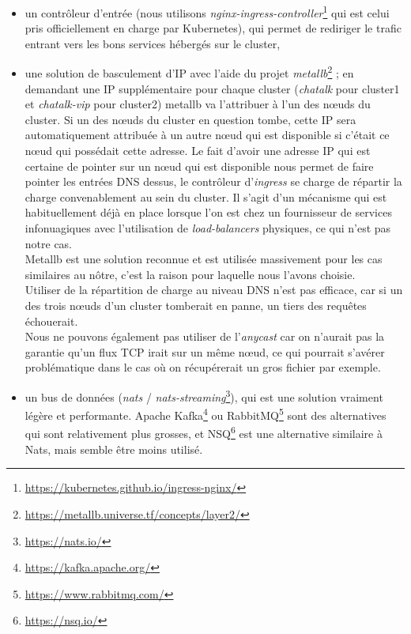 \begin{itemize}
\item
  un contrôleur d'entrée (nous utilisons
  \textit{nginx-ingress-controller}\footnote{
    \url{https://kubernetes.github.io/ingress-nginx/}}
  qui est celui pris officiellement en charge par Kubernetes), qui
  permet de rediriger le trafic entrant vers les bons services hébergés
  sur le cluster,
\item
  une solution de basculement d'IP avec l'aide du projet
  \textit{metallb}\footnote{
    \url{https://metallb.universe.tf/concepts/layer2/}}
  ; en demandant une IP supplémentaire pour chaque cluster
  (\textit{chatalk} pour cluster1 et \textit{chatalk-vip} pour cluster2)
  metallb va l'attribuer à l'un des nœuds du cluster. Si un des nœuds du
  cluster en question tombe, cette IP sera automatiquement attribuée à
  un autre nœud qui est disponible si c'était ce nœud qui possédait
  cette adresse. Le fait d'avoir une adresse IP qui est certaine de
  pointer sur un nœud qui est disponible nous permet de faire pointer
  les entrées DNS dessus, le contrôleur d'\textit{ingress} se charge de
  répartir la charge convenablement au sein du cluster. Il s'agit d'un
  mécanisme qui est habituellement déjà en place lorsque l'on est chez
  un fournisseur de services infonuagiques avec l'utilisation de
  \textit{load-balancers} physiques, ce qui n'est pas notre cas.\\
  Metallb est une solution reconnue et est utilisée massivement pour les
  cas similaires au nôtre, c'est la raison pour laquelle nous l'avons
  choisie.\\
  Utiliser de la répartition de charge au niveau DNS n'est pas efficace,
  car si un des trois nœuds d'un cluster tomberait en panne, un tiers
  des requêtes échouerait.\\
  Nous ne pouvons également pas utiliser de l'\textit{anycast} car on
  n'aurait pas la garantie qu'un flux TCP irait sur un même nœud, ce qui
  pourrait s'avérer problématique dans le cas où on récupérerait un gros
  fichier par exemple.
\item
  un bus de données (\textit{nats} /
  \textit{nats-streaming}\footnote{\url{https://nats.io/}}), qui est une
  solution vraiment légère et performante. Apache
  Kafka\footnote{\url{https://kafka.apache.org/}} ou
  RabbitMQ\footnote{\url{https://www.rabbitmq.com/}}
  sont des alternatives qui sont relativement plus grosses, et
  NSQ\footnote{\url{https://nsq.io/}} est une alternative
  similaire à Nats, mais semble être moins utilisé.\\

\end{itemize}
